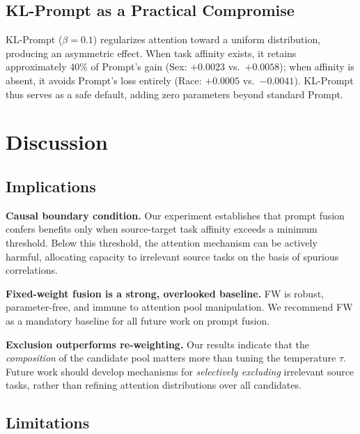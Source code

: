 \documentclass[sigconf,anonymous]{acmart}
\begin{document}
\subsection{KL-Prompt as a Practical Compromise}

KL-Prompt ($\beta=0.1$) regularizes attention toward a uniform distribution,
producing an asymmetric effect. When task affinity exists, it retains
approximately 40\% of Prompt's gain (Sex: $+0.0023$ vs.\ $+0.0058$); when
affinity is absent, it avoids Prompt's loss entirely (Race: $+0.0005$
vs.\ $-0.0041$). KL-Prompt thus serves as a safe default, adding zero
parameters beyond standard Prompt.

\section{Discussion}

\subsection{Implications}

\textbf{Causal boundary condition.} Our experiment establishes that prompt
fusion confers benefits only when source-target task affinity exceeds a
minimum threshold. Below this threshold, the attention mechanism can be
actively harmful, allocating capacity to irrelevant source tasks on the basis
of spurious correlations.

\textbf{Fixed-weight fusion is a strong, overlooked baseline.} FW is robust,
parameter-free, and immune to attention pool manipulation. We recommend FW as
a mandatory baseline for all future work on prompt fusion.

\textbf{Exclusion outperforms re-weighting.} Our results indicate that the
\emph{composition} of the candidate pool matters more than tuning the
temperature $\tau$. Future work should develop mechanisms for \emph{selectively
excluding} irrelevant source tasks, rather than refining attention
distributions over all candidates.

\subsection{Limitations}
\end{document}
